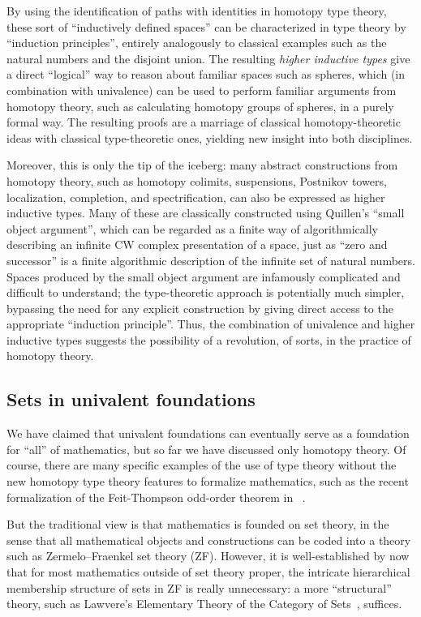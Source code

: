 By using the identification of paths with identities in homotopy type theory, these sort of ``inductively defined spaces'' can be characterized in type theory by ``induction principles'', entirely analogously to classical examples such as the natural numbers and the disjoint union.
The resulting \emph{higher inductive types} give a direct ``logical'' way to reason about familiar spaces such as spheres, which (in combination with univalence) can be used to perform familiar arguments from homotopy theory, such as calculating homotopy groups of spheres, in a purely formal way.
The resulting proofs are a marriage of classical homotopy-theoretic ideas with classical type-theoretic ones, yielding new insight into both disciplines.

Moreover, this is only the tip of the iceberg: many abstract constructions from homotopy theory, such as homotopy colimits, suspensions, Postnikov towers, localization, completion, and spectrification, can also be expressed as higher inductive types.
Many of these are classically constructed using Quillen's ``small object argument'', which can be regarded as a finite way of algorithmically describing an infinite CW complex presentation of a space, just as ``zero and successor'' is a finite algorithmic description of the infinite set of natural numbers.
Spaces produced by the small object argument are infamously complicated and difficult to understand; the type-theoretic approach is potentially much simpler, bypassing the need for any explicit construction by giving direct access to the appropriate ``induction principle''.
Thus, the combination of univalence and higher inductive types suggests the possibility of a revolution, of sorts, in the practice of homotopy theory.


\subsection*{Sets in univalent foundations}

We have claimed that univalent foundations can eventually serve as a foundation for ``all'' of mathematics, but so far we have discussed 
only homotopy theory.  Of course, there are many specific examples of the use of type theory without the new homotopy type theory features to formalize 
mathematics, such as the recent formalization of the  Feit-Thompson odd-order theorem in \Coq~\cite{gonthier}.

But the traditional view is that mathematics is founded on set theory, in the sense that all mathematical objects and constructions can be coded into a theory such as Zermelo--Fraenkel set theory (ZF).
However, it is well-established by now that for most mathematics outside of set theory proper, the intricate hierarchical membership structure of sets in ZF is really unnecessary: a more ``structural'' theory, such as Lawvere's Elementary Theory of the Category of Sets~\cite{lawvere:etcs-long}, suffices.

